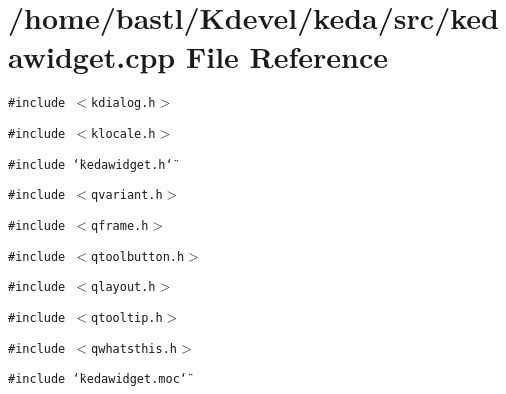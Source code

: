 \section{/home/bastl/Kdevel/keda/src/kedawidget.cpp File Reference}
\label{kedawidget_8cpp}
{\tt \#include $<$kdialog.h$>$}\par
{\tt \#include $<$klocale.h$>$}\par
{\tt \#include \char`\"{}kedawidget.h\char`\"{}}\par
{\tt \#include $<$qvariant.h$>$}\par
{\tt \#include $<$qframe.h$>$}\par
{\tt \#include $<$qtoolbutton.h$>$}\par
{\tt \#include $<$qlayout.h$>$}\par
{\tt \#include $<$qtooltip.h$>$}\par
{\tt \#include $<$qwhatsthis.h$>$}\par
{\tt \#include \char`\"{}kedawidget.moc\char`\"{}}\par
